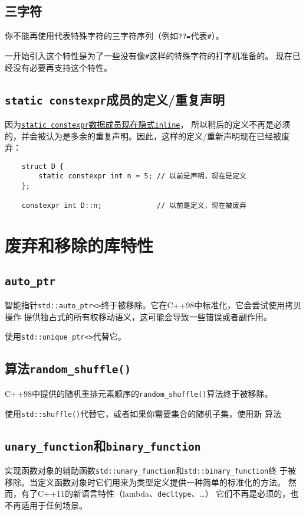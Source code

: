 \subsection{三字符}
你不能再使用代表特殊字符的三字符序列（例如\texttt{??=}代表\texttt{\#}）。

一开始引入这个特性是为了一些没有像\texttt{\#}这样的特殊字符的打字机准备的。
现在已经没有必要再支持这个特性。

\subsection{\texttt{static constexpr}成员的定义/重复声明}
因为\hyperref[ch3.3]{\texttt{static constexpr}数据成员现在隐式\texttt{inline}}，
所以稍后的定义不再是必须的，并会被认为是多余的重复声明。因此，这样的定义/重新声明现在已经被废弃：
\begin{lstlisting}
    struct D {
        static constexpr int n = 5; // 以前是声明，现在是定义
    };

    constexpr int D::n;             // 以前是定义，现在被废弃
\end{lstlisting}


\section{废弃和移除的库特性}

\subsection{\texttt{auto\_ptr}}
智能指针\texttt{std::auto\_ptr<>}终于被移除。它在C++98中标准化，它会尝试使用拷贝操作
提供独占式的所有权移动语义，这可能会导致一些错误或者副作用。

使用\texttt{std::unique\_ptr<>}代替它。

\subsection{算法\texttt{random\_shuffle()}}
C++98中提供的随机重排元素顺序的\texttt{random\_shuffle()}算法终于被移除。

使用\texttt{std::shuffle()}代替它，或者如果你需要集合的随机子集，使用新
算法

\subsection{\texttt{unary\_function}和\texttt{binary\_function}}
实现函数对象的辅助函数\texttt{std::unary\_function}和\texttt{std::binary\_function}终
于被移除。当定义函数对象时它们用来为类型定义提供一种简单的标准化的方法。
然而，有了C++11的新语言特性（lambda、\texttt{decltype}、\ldots）
它们不再是必须的，也不再适用于任何场景。

